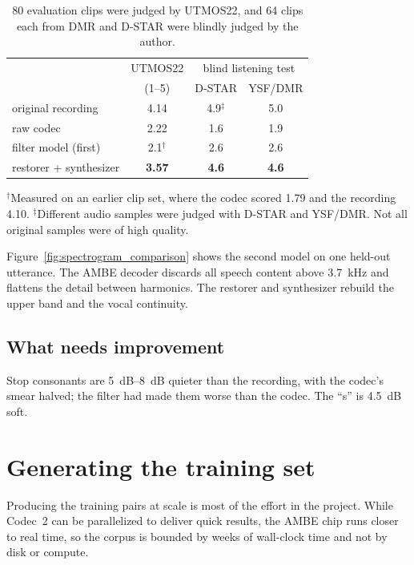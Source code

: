 \documentclass[10pt,twocolumn,a4paper]{article}
\newcommand{\refcleanmosF}{4.14}     %
\newcommand{\refcodecmosF}{2.22}     %
\newcommand{\refpipemos}{3.57}       %
\begin{document}
\begin{table}[t]
  \centering\small
  \caption{80 evaluation clips were judged by UTMOS22, and 64 clips each from
    DMR and D-STAR were blindly judged by the author.}
  \label{tab:learned}
  \begin{tabular}{@{}lccc@{}}
    \toprule
    & UTMOS22 & \multicolumn{2}{c}{blind listening test} \\
    & (1--5) & D-STAR & YSF/DMR \\
    \midrule
    original recording     & \refcleanmosF{} & 4.9$^{\ddagger}$ & 5.0 \\
    raw codec              & \refcodecmosF{} & 1.6 & 1.9 \\
    filter model (first)   & 2.1$^{\dagger}$ & 2.6 & 2.6 \\
    restorer + synthesizer & \textbf{\refpipemos{}} & \textbf{4.6} &
    \textbf{4.6} \\
    \bottomrule
  \end{tabular}

  \smallskip
  {\scriptsize $^{\dagger}$Measured on an earlier clip set, where the
    codec scored 1.79 and the recording 4.10.
    $^{\ddagger}$Different
    audio samples were judged with D-STAR and YSF/DMR. Not all
    original samples were of high quality.
  }
\end{table}

Figure~\ref{fig:spectrogram_comparison} shows the second model on one
held-out utterance. The AMBE decoder discards all speech content above
\SI{3.7}{kHz} and flattens the detail between harmonics. The restorer
and synthesizer rebuild the upper band and the vocal continuity.

\subsection{What needs improvement}
Stop consonants are \SIrange{5}{8}{dB}
quieter than the recording, with the codec's smear halved; the filter
had made them worse than the codec. The ``s'' is
\SI{4.5}{dB} soft.

\section{Generating the training set}
\label{sec:data}

Producing the training pairs at scale is most of the effort in the
project.
While Codec~2 can be parallelized to deliver quick results,
the AMBE chip runs closer to real time, so the corpus is bounded by weeks of wall-clock
time and not by disk or compute.
\end{document}
